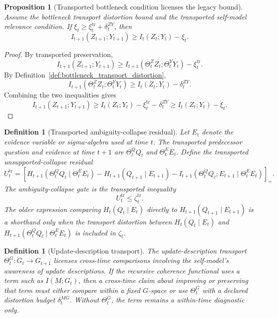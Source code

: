 \documentclass[11pt]{article}
\newtheorem{proposition}[theorem]{Proposition}
\newtheorem{definition}[theorem]{Definition}
\newcommand{\1}{\mathbf{1}}
\begin{document}
\begin{proposition}[Transported bottleneck condition licenses the legacy bound]
\label{prop:transported_bottleneck_legacy_bound}
Assume the bottleneck transport distortion bound and the transported self-model relevance condition. If \(\xi_t\ge\xi_t^{\mathrm{tr}}+\delta_t^{ZY}\), then
\[
I_{t+1}(Z_{t+1};Y_{t+1})\ge I_t(Z_t;Y_t)-\xi_t.
\]
\end{proposition}

\begin{proof}
By transported preservation,
\[
I_{t+1}(Z_{t+1};Y_{t+1})
\ge I_{t+1}(\Theta_t^Z Z_t;\Theta_t^Y Y_t)-\xi_t^{\mathrm{tr}}.
\]
By Definition~\ref{def:bottleneck_transport_distortion},
\[
I_{t+1}(\Theta_t^Z Z_t;\Theta_t^Y Y_t)
\ge I_t(Z_t;Y_t)-\delta_t^{ZY}.
\]
Combining the two inequalities gives
\[
I_{t+1}(Z_{t+1};Y_{t+1})
\ge I_t(Z_t;Y_t)-\xi_t^{\mathrm{tr}}-\delta_t^{ZY}
\ge I_t(Z_t;Y_t)-\xi_t.
\]
\end{proof}

\begin{definition}[Transported ambiguity-collapse residual]
\label{def:transported_ambiguity_collapse}
Let \(E_t\) denote the evidence variable or sigma-algebra used at time \(t\). The transported predecessor question and evidence at time \(t+1\) are \(\Theta_t^Q Q_t\) and \(\Theta_t^E E_t\). Define the transported unsupported-collapse residual
\[
U_t^{\mathrm{tr}}
=
\left[
H_{t+1}(\Theta_t^Q Q_t\mid \Theta_t^E E_t)
-
H_{t+1}(Q_{t+1}\mid E_{t+1})
-
I_{t+1}(\Theta_t^Q Q_t;E_{t+1}\mid \Theta_t^E E_t)
\right]_+.
\]
The ambiguity-collapse gate is the transported inequality
\[
U_t^{\mathrm{tr}}\le\zeta_t^{\mathrm{tr}}.
\]
The older expression comparing \(H_t(Q_t\mid E_t)\) directly to \(H_{t+1}(Q_{t+1}\mid E_{t+1})\) is a shorthand only when the transport distortion between \(H_t(Q_t\mid E_t)\) and \(H_{t+1}(\Theta_t^Q Q_t\mid\Theta_t^E E_t)\) is included in \(\zeta_t\).
\end{definition}

\begin{definition}[Update-description transport]
\label{def:update_description_transport}
The update-description transport \(\Theta_t^G:G_t\to G_{t+1}\) licenses cross-time comparisons involving the self-model's awareness of update descriptions. If the recursive coherence functional uses a term such as \(I(M;G_t)\), then a cross-time claim about improving or preserving that term must either compare within a fixed \(G\)-space or use \(\Theta_t^G\) with a declared distortion budget \(\delta_t^{MG}\). Without \(\Theta_t^G\), the term remains a within-time diagnostic only.
\end{definition}
\end{document}
